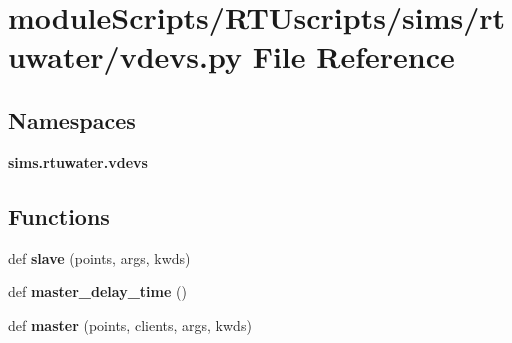 \section{module\+Scripts/\+R\+T\+Uscripts/sims/rtuwater/vdevs.py File Reference}
\label{rtuwater_2vdevs_8py}
\subsection*{Namespaces}
\begin{DoxyCompactItemize}
\item 
 {\bf sims.\+rtuwater.\+vdevs}
\end{DoxyCompactItemize}
\subsection*{Functions}
\begin{DoxyCompactItemize}
\item 
def {\bf slave} (points, args, kwds)
\item 
def {\bf master\+\_\+delay\+\_\+time} ()
\item 
def {\bf master} (points, clients, args, kwds)
\end{DoxyCompactItemize}

